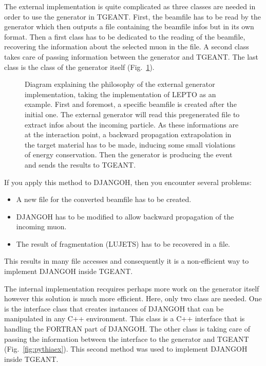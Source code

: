 The external implementation is quite complicated as three classes are needed in order to use the generator in TGEANT. First, the beamfile has to be read by the generator which then outputs a file containing the beamfile infos but in its own format. Then a first class has to be dedicated to the reading of the beamfile, recovering the information about the selected muon in the file. A second class takes care of passing information between the generator and TGEANT. The last class is the class of the generator itself (Fig.~\ref{fig:leptoex}).

\begin{figure}[!htb]
\centerline{}
\caption{Diagram explaining the philosophy of the external generator implementation, taking the
implementation of LEPTO as an example. First and foremost, a specific beamfile is created after the
initial one. The external generator will read this pregenerated file to extract infos about the incoming
particle. As these informations are at the interaction point, a backward propagation extrapolation in the
target material has to be made, inducing some small violations of energy conservation.
Then the generator is producing the event and sends the results to TGEANT.}\label{fig:leptoex}
\end{figure}

If you apply this method to DJANGOH, then you encounter several problems:
\begin{itemize}
\item A new file for the converted beamfile has to be created.
\item DJANGOH has to be modified to allow backward propagation of the incoming muon.
\item The result of fragmentation (LUJETS) has to be recovered in a file.
\end{itemize}
This results in many file accesses and consequently it is a non-efficient way to implement DJANGOH inside TGEANT.

The internal implementation recquires perhaps more work on the generator itself however this solution is much more efficient. Here, only two class are needed. One is the interface class that creates instances of DJANGOH that can be manipulated in any C++ environment. This class is a C++ interface that is handling the FORTRAN part of DJANGOH. The other class is taking care of passing the information between the interface to the generator and TGEANT (Fig.~\ref{fig:pythiaex}). This second method was used to implement DJANGOH inside TGEANT.

